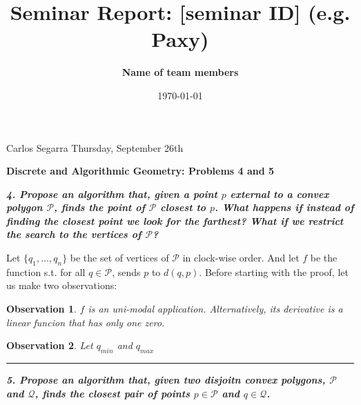 \documentclass[a4paper, 10pt]{article}
\title{Seminar Report: [seminar ID] (e.g. Paxy)}
\author{\textbf{Name of team members}}
\date{\normalsize\today{}}
\newtheorem{obs}{Observation}
\begin{document}
Carlos Segarra \hfill Thursday, September 26th

\vspace{15pt}

\textbf{\Large Discrete and Algorithmic Geometry: Problems 4 and 5}

\vspace{30pt}

\textbf{\textit{4. Propose an algorithm that, given a point $p$ external to a convex polygon $\mathcal{P}$, finds the point of $\mathcal{P}$ closest to $p$. What happens if instead of finding the closest point we look for the farthest? What if we restrict the search to the vertices of $\mathcal{P}$?}}

\vspace{3pt}

Let $\lbrace q_1, \dots, q_n\rbrace$ be the set of vertices of $\mathcal{P}$ in clock-wise order. And let $f$ be the function s.t. for all $q \in \mathcal{P}$, sends $p$ to $d(q, p)$. Before starting with the proof, let us make two observations:
\begin{obs}
    $f$ is an uni-modal application. Alternatively, its derivative is a linear funcion that has only one zero.
\end{obs}
\begin{obs}
    Let $q_{min}$ and $q_{max}$
\end{obs}

\vspace{10pt}

\begin{center}
    \hrule
\end{center}

\textbf{\textit{5. Propose an algorithm that, given two disjoitn convex polygons, $\mathcal{P}$ and $\mathcal{Q}$, finds the closest pair of points $p \in \mathcal{P}$ and $q \in \mathcal{Q}$.}}
\end{document}
